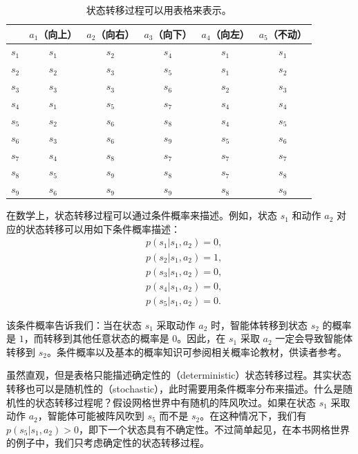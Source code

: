 \begin{table}[H]
\centering
\caption{状态转移过程可以用表格来表示。}
\label{tab:rl-basic-transition}
\begin{tabular}{cccccc}
\toprule
 & $a_1$（向上） & $a_2$（向右） & $a_3$（向下） & $a_4$（向左） & $a_5$（不动） \\
\midrule
$s_1$ & $s_1$ & $s_2$ & $s_4$ & $s_1$ & $s_1$ \\
$s_2$ & $s_2$ & $s_3$ & $s_5$ & $s_1$ & $s_2$ \\
$s_3$ & $s_3$ & $s_3$ & $s_6$ & $s_2$ & $s_3$ \\
$s_4$ & $s_1$ & $s_5$ & $s_7$ & $s_4$ & $s_4$ \\
$s_5$ & $s_2$ & $s_6$ & $s_8$ & $s_4$ & $s_5$ \\
$s_6$ & $s_3$ & $s_6$ & $s_9$ & $s_5$ & $s_6$ \\
$s_7$ & $s_4$ & $s_8$ & $s_7$ & $s_7$ & $s_7$ \\
$s_8$ & $s_5$ & $s_9$ & $s_8$ & $s_7$ & $s_8$ \\
$s_9$ & $s_6$ & $s_9$ & $s_9$ & $s_8$ & $s_9$ \\
\bottomrule
\end{tabular}
\end{table}

在数学上，状态转移过程可以通过条件概率来描述。例如，状态 $s_1$ 和动作 $a_2$ 对应的状态转移可以用如下条件概率描述：
\begin{equation}
\begin{aligned}
  & p(s_1 | s_1, a_2) = 0, \\
  & p(s_2 | s_1, a_2) = 1, \\
  & p(s_3 | s_1, a_2) = 0, \\
  & p(s_4 | s_1, a_2) = 0, \\
  & p(s_5 | s_1, a_2) = 0.
\end{aligned}
\end{equation}

该条件概率告诉我们：当在状态 $s_1$ 采取动作 $a_2$ 时，智能体转移到状态 $s_2$ 的概率是 $1$，而转移到其他任意状态的概率是 $0$。因此，在 $s_1$ 采取 $a_2$ 一定会导致智能体转移到 $s_2$。条件概率以及基本的概率知识可参阅相关概率论教材，供读者参考。

虽然直观，但是表格只能描述确定性的（deterministic）状态转移过程。其实状态转移也可以是随机性的（stochastic），此时需要用条件概率分布来描述。什么是随机性的状态转移过程呢？假设网格世界中有随机的阵风吹过。如果在状态 $s_1$ 采取动作 $a_2$，智能体可能被阵风吹到 $s_5$ 而不是 $s_2$。在这种情况下，我们有 $p(s_5 | s_1, a_2) > 0$，即下一个状态具有不确定性。不过简单起见，在本书网格世界的例子中，我们只考虑确定性的状态转移过程。

